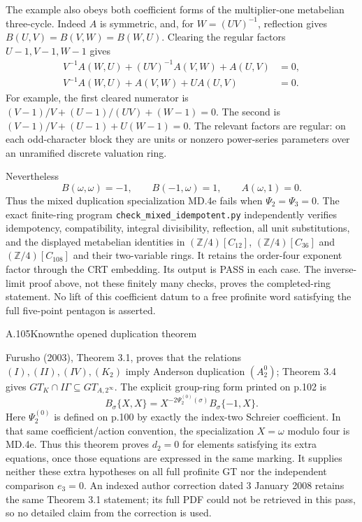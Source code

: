 The example also obeys both coefficient forms of the
multiplier-one metabelian three-cycle. Indeed $A$ is symmetric,
and, for $W=(UV)^{-1}$, reflection gives
$B(U,V)=B(V,W)=B(W,U)$. Clearing the regular factors
$U-1,V-1,W-1$ gives
\[
\begin{split}
 V^{-1}A(W,U)+(UV)^{-1}A(V,W)+A(U,V)&=0,\\
 V^{-1}A(W,U)+A(V,W)+U A(U,V)&=0.
\end{split}
\]
For example, the first cleared numerator is
$(V-1)/V+(U-1)/(UV)+(W-1)=0$.
The second is $(V-1)/V+(U-1)+U(W-1)=0$.
The relevant factors are regular: on each odd-character block
they are units or nonzero power-series parameters over an
unramified discrete valuation ring.

Nevertheless
\[
 B(\omega,\omega)=-1,\qquad B(-1,\omega)=1,
 \qquad A(\omega,1)=0.
\]
Thus the mixed duplication specialization MD.4e fails when
$\Psi_2=\Psi_3=0$. The exact finite-ring program
\texttt{check\_mixed\_idempotent.py} independently verifies
idempotency, compatibility, integral divisibility, reflection,
all unit substitutions, and the displayed metabelian identities
in $(\mathbb Z/4)[C_{12}]$, $(\mathbb Z/4)[C_{36}]$ and
$(\mathbb Z/4)[C_{108}]$ and their two-variable rings.
It retains the order-four exponent factor through the CRT embedding.
Its output is PASS in each case. The inverse-limit proof above,
not these finitely many checks, proves the completed-ring statement.
No lift of this coefficient datum to a free profinite word satisfying
the full five-point pentagon is asserted.

\begin{statement}{A.105}{Known}{the opened duplication theorem}
\citep[Theorems 3.1 and 3.4]{LitFurusho2003GTA} \citep[Theorems 2--3 and Appendix]{LitLochakNakamuraSchneps2004Eigenloci}
\end{statement}
Furusho (2003), Theorem 3.1, proves that the relations
$(I),(II),(IV),(K_2)$ imply Anderson duplication $(A_2^0)$;
Theorem 3.4 gives $GT_K\cap I\Gamma\subseteq GT_{A,2^\infty}$.
The explicit group-ring form printed on p.102 is
\[
 B_\sigma\{X,X\}
   =X^{-2\Psi_2^{(0)}(\sigma)}B_\sigma\{-1,X\}.
\]
Here $\Psi_2^{(0)}$ is defined on p.100 by exactly the
index-two Schreier coefficient. In that same coefficient/action
convention, the specialization $X=\omega$ modulo four is
MD.4e. Thus this theorem proves $d_2=0$ for elements satisfying
its extra equations, once those equations are expressed in the
same marking. It supplies neither these extra hypotheses on
all full profinite GT nor the independent comparison $e_3=0$.
An indexed author correction dated 3 January 2008 retains the
same Theorem 3.1 statement; its full PDF could not be retrieved
in this pass, so no detailed claim from the correction is used.

